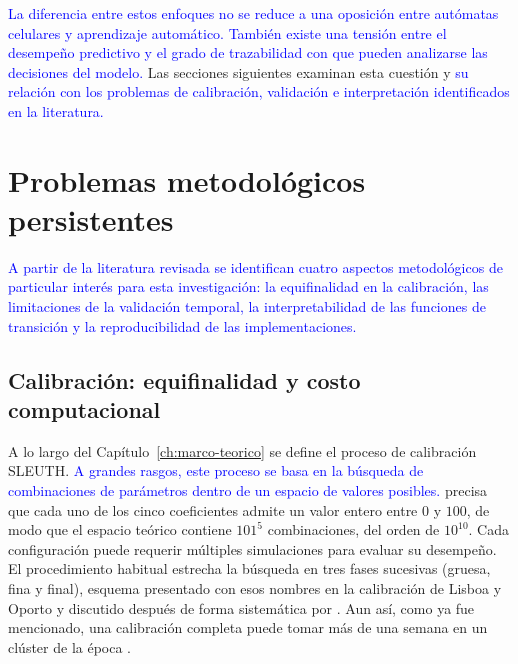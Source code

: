 \textcolor{blue}{La diferencia entre estos enfoques no se reduce a una
oposición entre autómatas celulares y aprendizaje automático. También existe
una tensión entre el desempeño predictivo y el grado de trazabilidad con que
pueden analizarse las decisiones del modelo.} Las secciones siguientes examinan
esta cuestión y \textcolor{blue}{su relación con los problemas de calibración,
validación e interpretación identificados en la literatura.}

%
%
%


\section{Problemas metodológicos persistentes}
\label{sec:problemas-metodologicos}

\textcolor{blue}{A partir de la literatura revisada se identifican cuatro
aspectos metodológicos de particular interés para esta investigación:
la equifinalidad en la calibración, las limitaciones de la validación temporal,
la interpretabilidad de las funciones de transición y la reproducibilidad de
las implementaciones.}

\subsection{Calibración: equifinalidad y costo computacional}

A lo largo del Capítulo~\ref{ch:marco-teorico} se define el proceso de
calibración SLEUTH. \textcolor{blue}{A grandes rasgos, este proceso se basa en
la búsqueda de combinaciones de parámetros dentro de un espacio de valores
posibles.} \textcite{Clarke2008} precisa que cada uno de los cinco coeficientes
admite un valor entero entre $0$ y $100$, de modo que el espacio teórico
contiene $101^5$ combinaciones, del orden de $10^{10}$. Cada configuración
puede requerir múltiples simulaciones para evaluar su desempeño. El
procedimiento habitual estrecha la búsqueda en tres fases sucesivas (gruesa,
fina y final), esquema presentado con esos nombres en la calibración de
Lisboa y Oporto \parencite{Silva2002} y discutido después de forma sistemática
por \textcite{Dietzel2007}. Aun así, como ya fue mencionado, una calibración
completa puede tomar más de una semana en un clúster de la época
\parencite{Jantz2003}.

